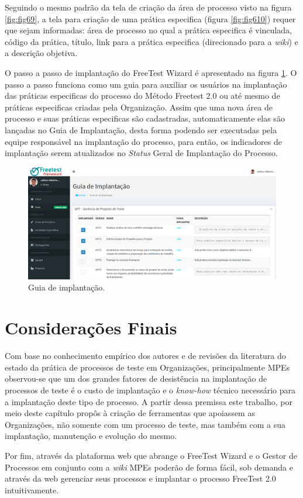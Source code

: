 Seguindo o mesmo padrão da tela de criação da área de processo visto na figura \ref{fig:fig69}, a tela para criação de uma prática especifica (figura \ref{fig:fig610}) requer que sejam informadas: área de processo no qual a prática especifica é vinculada, código da prática, título, link para a prática especifica (direcionado para a \textit{wiki}) e a descrição objetiva.

O passo a passo de implantação do FreeTest Wizard é apresentado na figura \ref{fig:fig611}. O passo a passo funciona como um guia para auxiliar os usuários na implantação das práticas especificas do processo do Método Freetest 2.0 ou até mesmo de práticas especificas criadas pela Organização. Assim que uma nova área de processo e suas práticas especificas são cadastradas, automaticamente elas são lançadas no Guia de Implantação, desta forma podendo ser executadas pela equipe responsável na implantação do processo, para então, os indicadores de implantação serem atualizados no \textit{Status} Geral de Implantação do Processo.

\begin{figure}[H]
\centering
\includegraphics[width=.90\textwidth]{fig/figura611.png}
\caption{Guia de implantação.}
\label{fig:fig611}
\end{figure}


\section{Considerações Finais}
\label{sec:consideracoesfinaiscap6}

Com base no conhecimento empírico dos autores e de revisões da literatura do estado da prática de processos de teste em Organizações, principalmente MPEs observou-se que um dos grandes fatores de desistência na implantação de processos de teste é o custo de implantação e o \textit{know-how} técnico necessário para a implantação deste tipo de processo. A partir dessa premissa este trabalho, por meio deste capítulo propôs à criação de ferramentas que apoiassem as Organizações, não somente com um processo de teste, mas também com a sua implantação, manutenção e evolução do mesmo. 

Por fim, através da plataforma web que abrange o FreeTest Wizard e o Gestor de Processos em conjunto com a \textit{wiki} MPEs poderão de forma fácil, sob demanda e através da web gerenciar seus processos e implantar o processo FreeTest 2.0 intuitivamente. 
